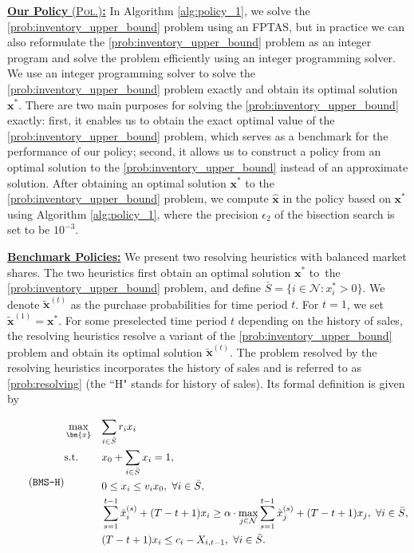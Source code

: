\documentclass[mnsc,non-blindrev]{informs3}
\theoremstyle{definition}
\begin{document}
\begin{appendices}{\Large{}}
{\noindent\underline{\textbf{Our Policy} \textsc{(Pol.)}\textbf{:}} In Algorithm \ref{alg:policy_1}, we solve the \ref{prob:inventory_upper_bound} problem using an FPTAS, but in practice we can also reformulate the \ref{prob:inventory_upper_bound} problem as an integer program and solve the problem efficiently using an integer programming solver. We use an integer programming solver to solve the \ref{prob:inventory_upper_bound} problem exactly and obtain its optimal solution $\bm{x}^*$. There are two main purposes for solving the \ref{prob:inventory_upper_bound} exactly: first, it enables us to obtain the exact optimal value of the \ref{prob:inventory_upper_bound} problem, which serves as a benchmark for the performance of our policy; second, it allows us to construct a policy from an optimal solution to the \ref{prob:inventory_upper_bound} instead of an approximate solution. After obtaining an optimal solution $\bm{x}^*$ to the \ref{prob:inventory_upper_bound} problem, we compute $\hat{\bm{x}}$ in the policy based on $\bm{x}^*$ using Algorithm \ref{alg:policy_1}, where the precision $\epsilon_2$ of the bisection search is set to be $10^{-3}$.

\noindent\underline{\bf Benchmark Policies:} We present two resolving heuristics with balanced market shares. The two heuristics first obtain an optimal solution $\bm{x}^*$ to~the \ref{prob:inventory_upper_bound} problem, and define \mbox{$\bar{S}=\{i\in\mathcal{N}:x^*_i>0\}$}. We denote $\tilde{\bm{x}}^{(t)}$ as the purchase probabilities for time period $t$. For $t=1$, we set $\tilde{\bm{x}}^{(1)}=\bm{x}^*$. For some preselected time period $t$ depending on the history of sales, the resolving heuristics resolve a variant of the \ref{prob:inventory_upper_bound} problem and obtain its optimal solution $\tilde{\bm{x}}^{(t)}$. The problem resolved by the resolving heuristics incorporates the history of sales and is referred to as \ref{prob:resolving} (the ``H" stands for history of sales). Its formal definition is given by

\begin{equation}\label{prob:resolving}
\tag{\texttt{BMS-H}}
\begin{aligned}
&\max_{\bm{x}}&&{\sum_{i\in\bar{S}}r_ix_i}\\
&\text{s.t.}&&{x_0+\sum_{i\in\bar{S}}x_i=1},\\
&&&{0\leq x_i\leq v_ix_0,\ \forall i\in\bar{S}},\\
&&&\sum_{s=1}^{t-1}\tilde{x}_i^{(s)}+(T-t+1)x_i\geq \alpha\cdot\max_{j\in\mathcal{N}}\sum_{s=1}^{t-1}\tilde{x}_j^{(s)}+(T-t+1)x_j,\ \forall i\in\bar{S},\\
&&&{(T-t+1)x_{i}\leq c_i-X_{i,t-1},\ \forall i\in\bar{S}.}
\end{aligned}
\end{equation}

}
\end{appendices}
\end{document}
